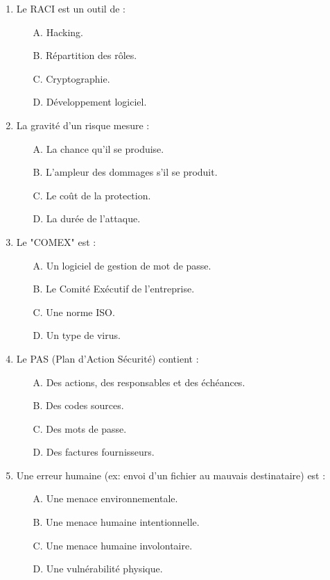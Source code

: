 \begin{enumerate}
    \item Le RACI est un outil de :
    \begin{itemize}
        \item[A.] Hacking.
        \item[B.] Répartition des rôles.
        \item[C.] Cryptographie.
        \item[D.] Développement logiciel.
    \end{itemize}

    \item La gravité d'un risque mesure :
    \begin{itemize}
        \item[A.] La chance qu'il se produise.
        \item[B.] L'ampleur des dommages s'il se produit.
        \item[C.] Le coût de la protection.
        \item[D.] La durée de l'attaque.
    \end{itemize}

    \item Le "COMEX" est :
    \begin{itemize}
        \item[A.] Un logiciel de gestion de mot de passe.
        \item[B.] Le Comité Exécutif de l'entreprise.
        \item[C.] Une norme ISO.
        \item[D.] Un type de virus.
    \end{itemize}

    \item Le PAS (Plan d'Action Sécurité) contient :
    \begin{itemize}
        \item[A.] Des actions, des responsables et des échéances.
        \item[B.] Des codes sources.
        \item[C.] Des mots de passe.
        \item[D.] Des factures fournisseurs.
    \end{itemize}

    \item Une erreur humaine (ex: envoi d'un fichier au mauvais destinataire) est :
    \begin{itemize}
        \item[A.] Une menace environnementale.
        \item[B.] Une menace humaine intentionnelle.
        \item[C.] Une menace humaine involontaire.
        \item[D.] Une vulnérabilité physique.
    \end{itemize}


\end{enumerate}

